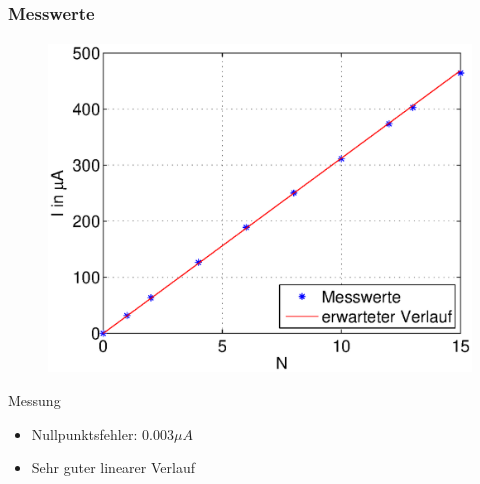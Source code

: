 \begin{frame}
    \frametitle{Messwerte}
    \framesubtitle{}
    \begin{figure}[H]
        \begin{center}
                \includegraphics[scale=0.5]{./img/graph/Aufgabe1a.eps}
        \end{center}
    \end{figure}
    \begin{block}{Messung}
        \begin{itemize}
            \item Nullpunktsfehler: $0.003 \mu A$
            \item Sehr guter linearer Verlauf
        \end{itemize}
    \end{block}
\end{frame}

